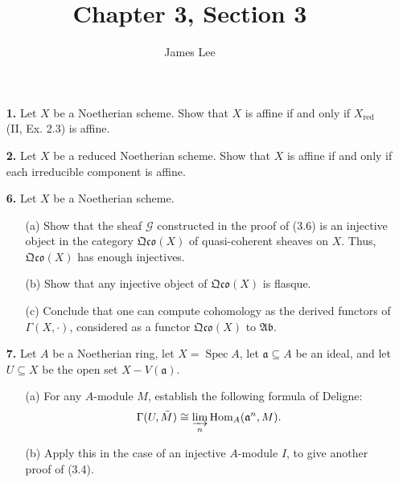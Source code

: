 \documentclass{article}
\title{Chapter 3, Section 3}
\author{James Lee}
\newcommand{\goth}[1]{\mathfrak{#1}}
\newcommand{\fG}{\mathscr{G}}
\DeclareMathOperator{\spec}{Spec}
\begin{document}
\maketitle
\begin{enumerate} [label=\textbf{\arabic*.}, leftmargin=0em]

\item[\textbf{1.}] Let $X$ be a Noetherian scheme.
Show that $X$ is affine if and only if $X_\text{red}$ (II, Ex. 2.3) is affine.

\item[\textbf{2.}] Let $X$ be a reduced Noetherian scheme.
Show that $X$ is affine if and only if each irreducible component is affine.

\item[\textbf{6.}] Let $X$ be a Noetherian scheme.
\begin{itemize}
  \item[(a)] Show that the sheaf $\fG$ constructed in the proof of (3.6) is an injective object in the category $\goth{Qco}(X)$ of quasi-coherent sheaves on $X$.
  Thus, $\goth{Qco}(X)$ has enough injectives.

  \item[(b)] Show that any injective object of $\goth{Qco}(X)$ is flasque.

  \item[(c)] Conclude that one can compute cohomology as the derived functors of $\Gamma(X, \cdot)$, considered as a functor $\goth{Qco}(X)$ to $\goth{Ab}$.
\end{itemize}

\item[\textbf{7.}] Let $A$ be a Noetherian ring, let $X = \spec{A}$, let $\goth{a} \subseteq A$ be an ideal, and let $U \subseteq X$ be the open set $X - V(\goth{a})$.
\begin{itemize}
  \item[(a)] For any $A$-module $M$, establish the following formula of Deligne:
  \begin{equation*}
    \Gamma(U, \tilde{M}) \cong \varinjlim_n{\text{Hom}_A(\goth{a}^n, M)}.
  \end{equation*}
  \item[(b)] Apply this in the case of an injective $A$-module $I$, to give another proof of (3.4).
\end{itemize}
\end{enumerate}
\end{document}
